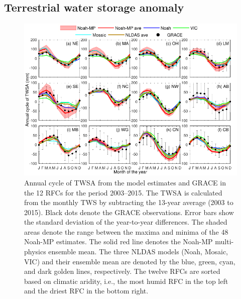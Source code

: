 \documentclass[essd, manuscript]{copernicus}
\begin{document}
\subsection{Terrestrial water storage anomaly}\label{sec:results:twsa}

\begin{figure}[t]
  \includegraphics[width=14cm]{fig/fig01.pdf}
  \caption{Annual cycle of TWSA from the model estimates and GRACE in the 12 RFCs for the period 2003--2015. The TWSA is calculated from the monthly TWS by subtracting the 13-year average (2003 to 2015). Black dots denote the GRACE observations. Error bars show the standard deviation of the year-to-year differences. The shaded areas denote the range between the maxima and minima of the 48 Noah-MP estimates. The solid red line denotes the Noah-MP multi-physics ensemble mean. The three NLDAS models (Noah, Mosaic, VIC) and their ensemble mean are denoted by the blue, green, cyan, and dark golden lines, respectively. The twelve RFCs are sorted based on climatic aridity, i.e., the most humid RFC in the top left and the driest RFC in the bottom right.}
  \label{fig:twsa:ancy}
\end{figure}
\end{document}
